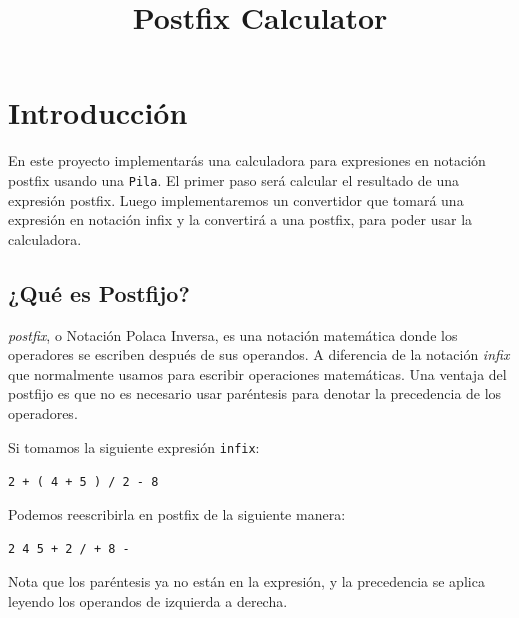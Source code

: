 \documentclass[10pt,a4paper]{article}
\title{Postfix Calculator}
\date{}
\begin{document}
\maketitle

\section{Introducción}

En este proyecto implementarás una calculadora para expresiones en notación postfix usando una \texttt{Pila}. El primer paso será calcular el resultado de una expresión postfix. Luego implementaremos un convertidor que tomará una expresión en notación infix y la convertirá a una postfix, para poder usar la calculadora.

\subsection{¿Qué es Postfijo?}
\textit{postfix}, o Notación Polaca Inversa, es una notación matemática donde los operadores se escriben después de sus operandos. A diferencia de la notación \textit{infix} que normalmente usamos para escribir operaciones matemáticas. Una ventaja del postfijo es que no es necesario usar paréntesis para denotar la precedencia de los operadores.

Si tomamos la siguiente expresión \texttt{infix}:

\begin{center}
\texttt{2 + ( 4 + 5 ) / 2 - 8}
\end{center}

Podemos reescribirla en postfix de la siguiente manera:

\begin{center}
\texttt{2 4 5 + 2 / + 8 -}
\end{center}

Nota que los paréntesis ya no están en la expresión, y la precedencia se aplica leyendo los operandos de izquierda a derecha.
\end{document}
